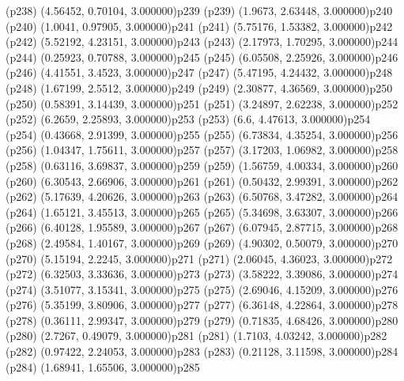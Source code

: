 \psdot(p238)
\psPoint(4.56452, 0.70104, 3.000000){p239}
\psdot(p239)
\psPoint(1.9673, 2.63448, 3.000000){p240}
\psdot(p240)
\psPoint(1.0041, 0.97905, 3.000000){p241}
\psdot(p241)
\psPoint(5.75176, 1.53382, 3.000000){p242}
\psdot(p242)
\psPoint(5.52192, 4.23151, 3.000000){p243}
\psdot(p243)
\psPoint(2.17973, 1.70295, 3.000000){p244}
\psdot(p244)
\psPoint(0.25923, 0.70788, 3.000000){p245}
\psdot(p245)
\psPoint(6.05508, 2.25926, 3.000000){p246}
\psdot(p246)
\psPoint(4.41551, 3.4523, 3.000000){p247}
\psdot(p247)
\psPoint(5.47195, 4.24432, 3.000000){p248}
\psdot(p248)
\psPoint(1.67199, 2.5512, 3.000000){p249}
\psdot(p249)
\psPoint(2.30877, 4.36569, 3.000000){p250}
\psdot(p250)
\psPoint(0.58391, 3.14439, 3.000000){p251}
\psdot(p251)
\psPoint(3.24897, 2.62238, 3.000000){p252}
\psdot(p252)
\psPoint(6.2659, 2.25893, 3.000000){p253}
\psdot(p253)
\psPoint(6.6, 4.47613, 3.000000){p254}
\psdot(p254)
\psPoint(0.43668, 2.91399, 3.000000){p255}
\psdot(p255)
\psPoint(6.73834, 4.35254, 3.000000){p256}
\psdot(p256)
\psPoint(1.04347, 1.75611, 3.000000){p257}
\psdot(p257)
\psPoint(3.17203, 1.06982, 3.000000){p258}
\psdot(p258)
\psPoint(0.63116, 3.69837, 3.000000){p259}
\psdot(p259)
\psPoint(1.56759, 4.00334, 3.000000){p260}
\psdot(p260)
\psPoint(6.30543, 2.66906, 3.000000){p261}
\psdot(p261)
\psPoint(0.50432, 2.99391, 3.000000){p262}
\psdot(p262)
\psPoint(5.17639, 4.20626, 3.000000){p263}
\psdot(p263)
\psPoint(6.50768, 3.47282, 3.000000){p264}
\psdot(p264)
\psPoint(1.65121, 3.45513, 3.000000){p265}
\psdot(p265)
\psPoint(5.34698, 3.63307, 3.000000){p266}
\psdot(p266)
\psPoint(6.40128, 1.95589, 3.000000){p267}
\psdot(p267)
\psPoint(6.07945, 2.87715, 3.000000){p268}
\psdot(p268)
\psPoint(2.49584, 1.40167, 3.000000){p269}
\psdot(p269)
\psPoint(4.90302, 0.50079, 3.000000){p270}
\psdot(p270)
\psPoint(5.15194, 2.2245, 3.000000){p271}
\psdot(p271)
\psPoint(2.06045, 4.36023, 3.000000){p272}
\psdot(p272)
\psPoint(6.32503, 3.33636, 3.000000){p273}
\psdot(p273)
\psPoint(3.58222, 3.39086, 3.000000){p274}
\psdot(p274)
\psPoint(3.51077, 3.15341, 3.000000){p275}
\psdot(p275)
\psPoint(2.69046, 4.15209, 3.000000){p276}
\psdot(p276)
\psPoint(5.35199, 3.80906, 3.000000){p277}
\psdot(p277)
\psPoint(6.36148, 4.22864, 3.000000){p278}
\psdot(p278)
\psPoint(0.36111, 2.99347, 3.000000){p279}
\psdot(p279)
\psPoint(0.71835, 4.68426, 3.000000){p280}
\psdot(p280)
\psPoint(2.7267, 0.49079, 3.000000){p281}
\psdot(p281)
\psPoint(1.7103, 4.03242, 3.000000){p282}
\psdot(p282)
\psPoint(0.97422, 2.24053, 3.000000){p283}
\psdot(p283)
\psPoint(0.21128, 3.11598, 3.000000){p284}
\psdot(p284)
\psPoint(1.68941, 1.65506, 3.000000){p285}
